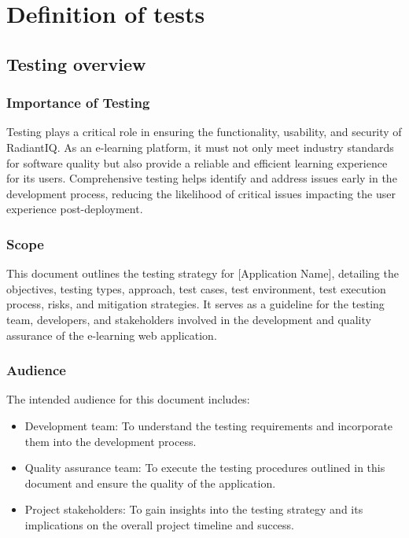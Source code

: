 \section{Definition of tests} \label{definition_of_tests}

	\subsection{Testing overview}

		\subsubsection{Importance of Testing}

		Testing plays a critical role in ensuring the functionality, usability, and security of RadiantIQ. As an e-learning platform, it must not only meet industry standards for software quality but also provide a reliable and efficient learning experience for its users. Comprehensive testing helps identify and address issues early in the development process, reducing the likelihood of critical issues impacting the user experience post-deployment.

		\subsubsection{Scope}

		This document outlines the testing strategy for [Application Name], detailing the objectives, testing types, approach, test cases, test environment, test execution process, risks, and mitigation strategies. It serves as a guideline for the testing team, developers, and stakeholders involved in the development and quality assurance of the e-learning web application.

		\subsubsection{Audience}
		
		The intended audience for this document includes:
		
		\begin{itemize}
			\item Development team: To understand the testing requirements and incorporate them into the development process.
			\item Quality assurance team: To execute the testing procedures outlined in this document and ensure the quality of the application.
			\item Project stakeholders: To gain insights into the testing strategy and its implications on the overall project timeline and success.
		\end{itemize}
		
